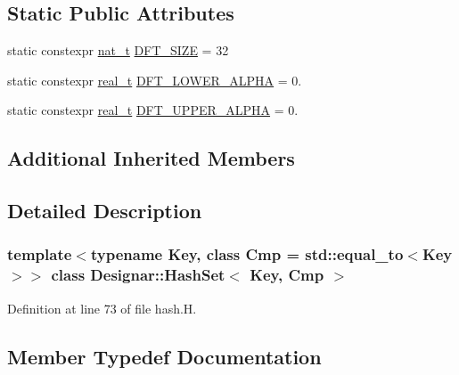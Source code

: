 \subsection*{Static Public Attributes}
\begin{DoxyCompactItemize}
\item 
static constexpr \hyperlink{namespace_designar_aa72662848b9f4815e7bf31a7cf3e33d1}{nat\+\_\+t} \hyperlink{class_designar_1_1_hash_set_a23c3da93ad9449838ab2c78526cd9dbd}{D\+F\+T\+\_\+\+S\+I\+ZE} = 32
\item 
static constexpr \hyperlink{namespace_designar_aca2c32af26808dbec1f3a3071fad25ce}{real\+\_\+t} \hyperlink{class_designar_1_1_hash_set_a71c4eb3bdbf207310cb61832e0c44fdf}{D\+F\+T\+\_\+\+L\+O\+W\+E\+R\+\_\+\+A\+L\+P\+HA} = 0.
\item 
static constexpr \hyperlink{namespace_designar_aca2c32af26808dbec1f3a3071fad25ce}{real\+\_\+t} \hyperlink{class_designar_1_1_hash_set_ab7e07181f29465aa1457e6abb9397be1}{D\+F\+T\+\_\+\+U\+P\+P\+E\+R\+\_\+\+A\+L\+P\+HA} = 0.
\end{DoxyCompactItemize}
\subsection*{Additional Inherited Members}


\subsection{Detailed Description}
\subsubsection*{template$<$typename Key, class Cmp = std\+::equal\+\_\+to$<$\+Key$>$$>$\newline
class Designar\+::\+Hash\+Set$<$ Key, Cmp $>$}



Definition at line 73 of file hash.\+H.



\subsection{Member Typedef Documentation}
\mbox{\label{class_designar_1_1_hash_set_ad0ab040392888a3320d2d72d1ead9968}} 
